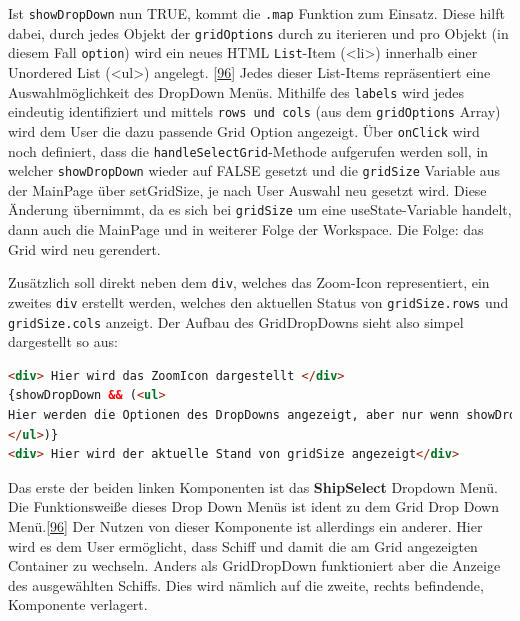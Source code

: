 \documentclass[
    headings=optiontotocandhead,%
    twoside,
    numbers=noenddot,%
    12pt, %
    titlepage, %
    parskip=full, %
    listof=leveldown, 
    numbers=noenddot, %
    a4paper,DIV=14,
    BCOR=15mm,
]{scrbook}
\newcommand{\passthrough}[1]{#1}
\begin{document}
Ist \passthrough{\lstinline!showDropDown!} nun TRUE, kommt die
\passthrough{\lstinline!.map!} Funktion zum Einsatz. Diese hilft dabei,
durch jedes Objekt der \passthrough{\lstinline!gridOptions!} durch zu
iterieren und pro Objekt (in diesem Fall
\passthrough{\lstinline!option!}) wird ein neues HTML
\passthrough{\lstinline!List!}-Item (\textless li\textgreater) innerhalb
einer Unordered List (\textless ul\textgreater) angelegt.
{[}\protect\hyperlink{ref-Ionos-JS-map}{96}{]} Jedes dieser List-Items
repräsentiert eine Auswahlmöglichkeit des DropDown Menüs. Mithilfe des
\passthrough{\lstinline!labels!} wird jedes eindeutig identifiziert und
mittels \passthrough{\lstinline!rows und cols!} (aus dem
\passthrough{\lstinline!gridOptions!} Array) wird dem User die dazu
passende Grid Option angezeigt. Über \passthrough{\lstinline!onClick!}
wird noch definiert, dass die
\passthrough{\lstinline!handleSelectGrid!}-Methode aufgerufen werden
soll, in welcher \passthrough{\lstinline!showDropDown!} wieder auf FALSE
gesetzt und die \passthrough{\lstinline!gridSize!} Variable aus der
MainPage über setGridSize, je nach User Auswahl neu gesetzt wird. Diese
Änderung übernimmt, da es sich bei \passthrough{\lstinline!gridSize!} um
eine useState-Variable handelt, dann auch die MainPage und in weiterer
Folge der Workspace. Die Folge: das Grid wird neu gerendert.

Zusätzlich soll direkt neben dem \passthrough{\lstinline!div!}, welches
das Zoom-Icon representiert, ein zweites \passthrough{\lstinline!div!}
erstellt werden, welches den aktuellen Status von
\passthrough{\lstinline!gridSize.rows!} und
\passthrough{\lstinline!gridSize.cols!} anzeigt. Der Aufbau des
GridDropDowns sieht also simpel dargestellt so aus:

\begin{lstlisting}[language=HTML, caption={HTML Aufbau GridDropDown}]
<div> Hier wird das ZoomIcon dargestellt </div>
{showDropDown && (<ul> 
Hier werden die Optionen des DropDowns angezeigt, aber nur wenn showDropDown positiv ist 
</ul>)}
<div> Hier wird der aktuelle Stand von gridSize angezeigt</div>
\end{lstlisting}

Das erste der beiden linken Komponenten ist das \textbf{ShipSelect}
Dropdown Menü. Die Funktionsweiße dieses Drop Down Menüs ist ident zu
dem Grid Drop Down Menü.{[}\protect\hyperlink{ref-Ionos-JS-map}{96}{]}
Der Nutzen von dieser Komponente ist allerdings ein anderer. Hier wird
es dem User ermöglicht, dass Schiff und damit die am Grid angezeigten
Container zu wechseln. Anders als GridDropDown funktioniert aber die
Anzeige des ausgewählten Schiffs. Dies wird nämlich auf die zweite,
rechts befindende, Komponente verlagert.
\end{document}
